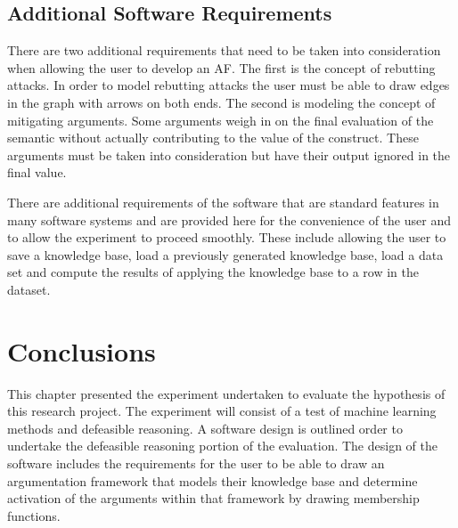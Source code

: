 \subsection{Additional Software Requirements}

There are two additional requirements that need to be taken into consideration when allowing the user to develop an AF. The first is the concept of rebutting attacks. In order to model rebutting attacks the user must be able to draw edges in the graph with arrows on both ends. The second is modeling the concept of mitigating arguments. Some arguments weigh in on the final evaluation of the semantic without actually contributing to the value of the construct. These arguments must be taken into consideration but have their output ignored in the final value. 


There are additional requirements of the software that are standard features in many software systems and are provided here for the convenience of the user and to allow the experiment to proceed smoothly. These include allowing the user to save a knowledge base, load a previously generated knowledge base, load a data set and compute the results of applying the knowledge base to a row in the dataset.


\section{Conclusions}

This chapter presented the experiment undertaken to evaluate the hypothesis of this research project. The experiment will consist of a test of machine learning methods and defeasible reasoning. A software design is outlined order to undertake the defeasible reasoning portion of the evaluation. The design of the software includes the requirements for the user to be able to draw an argumentation framework that models their knowledge base and determine activation of the arguments within that framework by drawing membership functions.